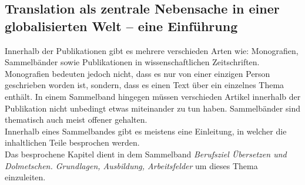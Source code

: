 \documentclass{article}
\begin{document}
	\subsection{Translation als zentrale Nebensache in einer globalisierten Welt – eine Einführung}
	Innerhalb der Publikationen gibt es mehrere verschieden Arten wie: Monografien, Sammelbänder sowie Publikationen in wissenschaftlichen Zeitschriften. Monografien bedeuten jedoch nicht, dass es nur von einer einzigen Person geschrieben worden ist, sondern, dass es einen Text über ein einzelnes Thema enthält. In einem Sammelband hingegen müssen verschieden Artikel innerhalb der Publikation nicht unbedingt etwas miteinander zu tun haben. Sammelbänder sind thematisch auch meist offener gehalten.\\
	Innerhalb eines Sammelbandes gibt es meistens eine Einleitung, in welcher die inhaltlichen Teile besprochen werden. \\
	Das besprochene Kapitel dient in dem Sammelband \textit{Berufsziel Übersetzen und Dolmetschen. Grundlagen, Ausbildung, Arbeitsfelder} um dieses Thema einzuleiten.

	
\end{document}
